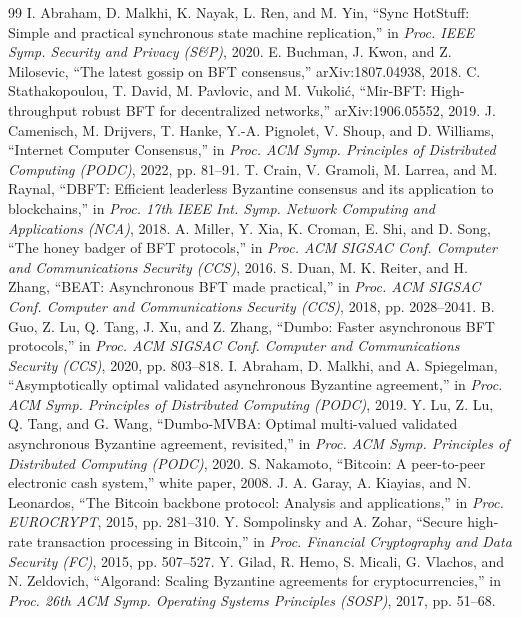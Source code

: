 \documentclass[UTF8,fontset=windows,a4paper,11pt]{ctexart}
\begin{document}
\begin{thebibliography}{99}
 I. Abraham, D. Malkhi, K. Nayak, L. Ren, and M. Yin, “Sync HotStuff: Simple and practical synchronous state machine replication,” in \textit{Proc. IEEE Symp. Security and Privacy (S\&P)}, 2020.
 E. Buchman, J. Kwon, and Z. Milosevic, “The latest gossip on BFT consensus,” arXiv:1807.04938, 2018.
 C. Stathakopoulou, T. David, M. Pavlovic, and M. Vukolić, “Mir-BFT: High-throughput robust BFT for decentralized networks,” arXiv:1906.05552, 2019.
 J. Camenisch, M. Drijvers, T. Hanke, Y.-A. Pignolet, V. Shoup, and D. Williams, “Internet Computer Consensus,” in \textit{Proc. ACM Symp. Principles of Distributed Computing (PODC)}, 2022, pp. 81–91.
 T. Crain, V. Gramoli, M. Larrea, and M. Raynal, “DBFT: Efficient leaderless Byzantine consensus and its application to blockchains,” in \textit{Proc. 17th IEEE Int. Symp. Network Computing and Applications (NCA)}, 2018.
 A. Miller, Y. Xia, K. Croman, E. Shi, and D. Song, “The honey badger of BFT protocols,” in \textit{Proc. ACM SIGSAC Conf. Computer and Communications Security (CCS)}, 2016.
 S. Duan, M. K. Reiter, and H. Zhang, “BEAT: Asynchronous BFT made practical,” in \textit{Proc. ACM SIGSAC Conf. Computer and Communications Security (CCS)}, 2018, pp. 2028–2041.
 B. Guo, Z. Lu, Q. Tang, J. Xu, and Z. Zhang, “Dumbo: Faster asynchronous BFT protocols,” in \textit{Proc. ACM SIGSAC Conf. Computer and Communications Security (CCS)}, 2020, pp. 803–818.
 I. Abraham, D. Malkhi, and A. Spiegelman, “Asymptotically optimal validated asynchronous Byzantine agreement,” in \textit{Proc. ACM Symp. Principles of Distributed Computing (PODC)}, 2019.
 Y. Lu, Z. Lu, Q. Tang, and G. Wang, “Dumbo-MVBA: Optimal multi-valued validated asynchronous Byzantine agreement, revisited,” in \textit{Proc. ACM Symp. Principles of Distributed Computing (PODC)}, 2020.
 S. Nakamoto, “Bitcoin: A peer-to-peer electronic cash system,” white paper, 2008.
 J. A. Garay, A. Kiayias, and N. Leonardos, “The Bitcoin backbone protocol: Analysis and applications,” in \textit{Proc. EUROCRYPT}, 2015, pp. 281–310.
 Y. Sompolinsky and A. Zohar, “Secure high-rate transaction processing in Bitcoin,” in \textit{Proc. Financial Cryptography and Data Security (FC)}, 2015, pp. 507–527.
 Y. Gilad, R. Hemo, S. Micali, G. Vlachos, and N. Zeldovich, “Algorand: Scaling Byzantine agreements for cryptocurrencies,” in \textit{Proc. 26th ACM Symp. Operating Systems Principles (SOSP)}, 2017, pp. 51–68.

\end{thebibliography}
\end{document}
